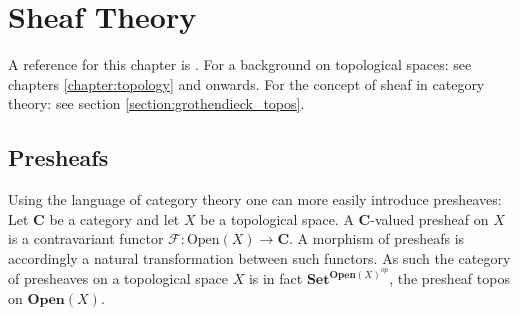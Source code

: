 \chapter{Sheaf Theory}\label{chapter:sheaf}

A reference for this chapter is \cite{brylinski}. For a background on topological spaces: see chapters \ref{chapter:topology} and onwards. For the concept of sheaf in category theory: see section \ref{section:grothendieck_topos}.

\section{Presheafs}

	
	
	\begin{adefinition}
		Using the language of category theory one can more easily introduce presheaves: Let $\mathbf{C}$ be a category and let $X$ be a topological space. A $\mathbf{C}$-valued presheaf on $X$ is a contravariant functor $\mathcal{F}:\text{Open}(X)\rightarrow\mathbf{C}$. A morphism of presheafs is accordingly a natural transformation between such functors. As such the category of presheaves on a topological space $X$ is in fact $\textbf{Set}^{\textbf{Open}(X)^{op}}$, the presheaf topos on $\textbf{Open}(X)$.
	\end{adefinition}
	
